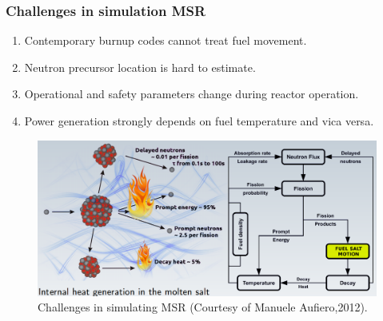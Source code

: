 \begin{frame}
  \frametitle{Challenges in simulation \gls{MSR}}
                  \vspace*{-0.05in}
               \begin{enumerate}
                \item Contemporary burnup codes cannot treat fuel movement.
                \item Neutron precursor location is hard to estimate.
                \item Operational and safety parameters change during reactor operation.
                \item Power generation strongly depends on fuel temperature and vica versa.
               \end{enumerate}

           \begin{figure}[t]
                \vspace*{-0.05in}
			\hspace*{-0.2in}
                \includegraphics[height=0.47\textwidth]{./images/coupled_physics.png}
		\vspace*{-0.05in}
		\caption{Challenges in simulating \gls{MSR} (Courtesy of Manuele Aufiero,2012).}
     	 \end{figure}               
\end{frame}

